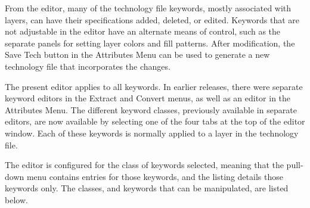 From the editor, many of the technology file keywords, mostly
associated with layers, can have their specifications added, deleted,
or edited.  Keywords that are not adjustable in the editor have an
alternate means of control, such as the separate panels for setting
layer colors and fill patterns.  After modification, the {\cb Save
Tech} button in the {\cb Attributes Menu} can be used to generate a
new technology file that incorporates the changes.

The present editor applies to all keywords.  In earlier {\Xic}
releases, there were separate keyword editors in the {\cb Extract} and
{\cb Convert} menus, as well as an editor in the {\cb Attributes
Menu}.  The different keyword classes, previously available in
separate editors, are now available by selecting one of the four tabs
at the top of the editor window.  Each of these keywords is normally
applied to a layer in the technology file.

The editor is configured for the class of keywords selected, meaning
that the pull-down menu contains entries for those keywords, and the
listing details those keywords only.  The classes, and keywords that
can be manipulated, are listed below.

